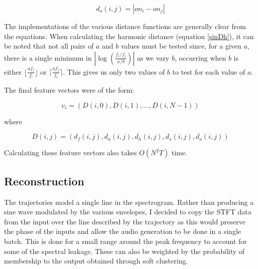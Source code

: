 \documentclass[12pt,a4paper,twoside,openright]{report}
\begin{document}
\begin{equation}
d_o(i,j) = \left| \mathit{on}_i - \mathit{on}_j \right|
\end{equation}

The implementations of the various distance functions are generally clear from the equations. When calculating the harmonic distance (equation \ref{sinDh}), it can be noted that not all pairs of $ a $ and $ b $ values must be tested since, for a given $ a $, there is a single minimum in $ \left| \log \left( \frac{f_i/f_j}{a/b} \right) \right| $ as we vary $ b $, occurring when $ b $ is either $ \lfloor \frac{af_j}{f_i} \rfloor $ or $ \lceil \frac{af_j}{f_i} \rceil $. This gives us only two values of $ b $ to test for each value of $ a $. 

The final feature vectors were of the form:

\begin{equation}
v_i = \left( D(i, 0), D(i, 1), \ldots, D(i, N-1) \right)
\end{equation}

where

\begin{equation}
D(i, j) = \left( d_f(i, j), d_a(i, j), d_h(i, j), d_s(i, j), d_o(i, j) \right)
\end{equation}

Calculating these feature vectors also takes $ O(N^2 T) $ time.

\subsection{Reconstruction}

The trajectories model a single line in the spectrogram. Rather than producing a sine wave modulated by the various envelopes, I decided to copy the STFT data from the input over the line described by the trajectory as this would preserve the phase of the inputs and allow the audio generation to be done in a single batch. This is done for a small range around the peak frequency to account for some of the spectral leakage. These can also be weighted by the probability of membership to the output obtained through soft clustering.

\end{document}
